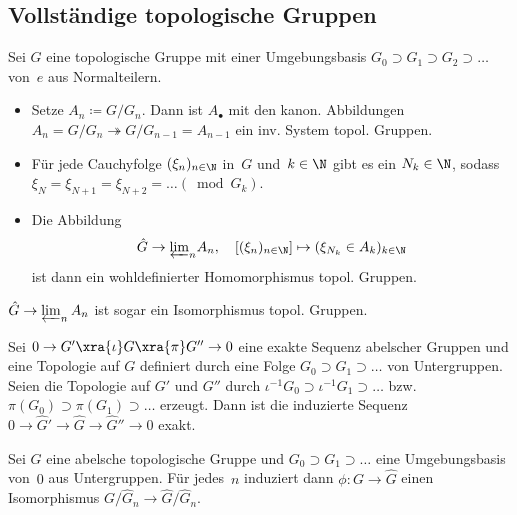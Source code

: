 \documentclass{cheat-sheet}
\newcommand{\thra}{\twoheadrightarrow}
\begin{document}
\subsection{Vollständige topologische Gruppen}

\begin{konstr}
  Sei $G$ eine topologische Gruppe mit einer Umgebungsbasis $G_0 \supset G_1 \supset G_2 \supset \ldots$ von~$e$ aus Normalteilern.
  \begin{itemize}
    \item Setze $A_n \coloneqq G/G_n$.
    Dann ist $A_\bullet$ mit den kanon. Abbildungen $A_n = G / G_n \thra G / G_{n-1} = A_{n-1}$ ein inv. System topol. Gruppen.
    \item Für jede Cauchyfolge $(\xi_n)_{n \in \N}$ in~$G$ und~$k \in \N$ gibt es ein $N_k \in \N$, sodass $\xi_N = \xi_{N+1} = \xi_{N+2} = \ldots (\bmod{G_k})$.
    \item Die Abbildung
    \[
      \hat{G} \to {\varprojlim}_{n} A_n, \quad
      [(\xi_n)_{n \in \N}] \mapsto (\xi_{N_k} \in A_k)_{k \in \N}
    \]
    ist dann ein wohldefinierter Homomorphismus topol. Gruppen.
  \end{itemize}
\end{konstr}

\begin{prop}
  $\hat{G} \to \varprojlim_{n} A_n$ \enspace
  ist sogar ein Isomorphismus topol. Gruppen.
\end{prop}


\begin{satz}
  Sei $0 \to G' \xra{\iota} G \xra{\pi} G'' \to 0$ eine exakte Sequenz abelscher Gruppen und eine Topologie auf $G$ definiert durch eine Folge $G_0 \supset G_1 \supset \ldots$ von Untergruppen.
  Seien die Topologie auf $G'$ und $G''$ durch $\iota^{-1} G_0 \supset \iota^{-1} G_1 \supset \ldots$ bzw. $\pi(G_0) \supset \pi(G_1) \supset \ldots$ erzeugt.
  Dann ist die induzierte Sequenz $0 \to \hat{G}' \to \hat{G} \to \hat{G}'' \to 0$ exakt.
\end{satz}

\begin{kor}
  Sei $G$ eine abelsche topologische Gruppe und $G_0 \supset G_1 \supset \ldots$ eine Umgebungsbasis von~$0$ aus Untergruppen.
  Für jedes~$n$ induziert dann $\phi : G \to \hat{G}$ einen Isomorphismus $G/\hat{G}_n \to \hat{G} / \hat{G}_n$.
\end{kor}
\end{document}
